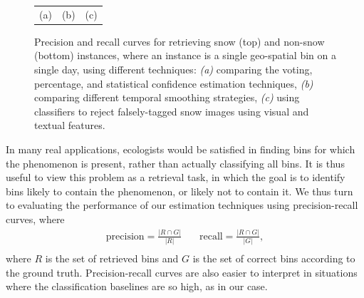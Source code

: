 \begin{figure}[ht!]
\begin{center}
\begin{tabular}{c|c|c}
(a) & (b) & (c) \\ 
\end{tabular}
\end{center}
\vspace{-20pt}
\caption{Precision and recall curves for retrieving snow (top) and non-snow (bottom) instances, where an instance is a single geo-spatial bin on a single day, using different techniques: 
\textit{(a)} comparing the voting, percentage, and statistical confidence estimation techniques, 
\textit{(b)} comparing different temporal smoothing strategies, 
\textit{(c)} using classifiers to reject falsely-tagged snow images using visual and textual features.}
\label{fig:votingconfidencepercentage}
\vspace{-12pt}
\end{figure}

In many real applications, ecologists would be satisfied in finding bins
for which the phenomenon is present, rather than actually classifying
all bins. It is thus useful to view this problem as a retrieval task,
in which the goal is to identify bins likely to contain the
phenomenon, or likely not to contain it. We thus turn to evaluating
the performance of our estimation techniques using precision-recall curves, where
%
\[
\begin{array}{cc}
\mbox{precision}=\frac{|R\cap G|}{|R|} \,\,\, &  \,\,\,
\mbox{recall}=\frac{|R\cap G|}{|G|}, \\
\end{array}
\]
%
where $R$ is the set of retrieved bins and $G$ is the set of correct
bins according to the ground truth.  Precision-recall curves are also
easier to interpret in situations where the classification baselines are so
high, as in our case.




